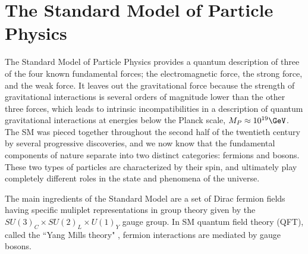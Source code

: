 \section{The Standard Model of Particle Physics}
\label{sec:sm}
The Standard Model of Particle Physics provides a quantum description of three of the four known fundamental forces; the electromagnetic force, the strong force, and the weak force.  It leaves out the gravitational force because the strength of gravitational interactions is several orders of magnitude lower than the other three forces, which leads to intrinsic incompatibilities in a description of quantum gravitational interactions at energies below the Planck scale, $M_P\approx10^{19}\GeV$.  The SM was pieced together throughout the second half of the twentieth century by several progressive discoveries, and we now know that the fundamental components of nature separate into two distinct categories: fermions and bosons.  These two types of particles are characterized by their spin, and ultimately play completely different roles in the state and phenomena of the universe. \cite{tully}

The main ingredients of the Standard Model are a set of Dirac fermion fields having specific muliplet representations in group theory given by the $SU(3)_{C} \times SU(2)_{L} \times U(1)_{Y}$ gauge group.  In SM quantum field theory (QFT), called the ``Yang Mills theory" \cite{PhysRev.96.191}, fermion interactions are mediated by gauge bosons.  %

